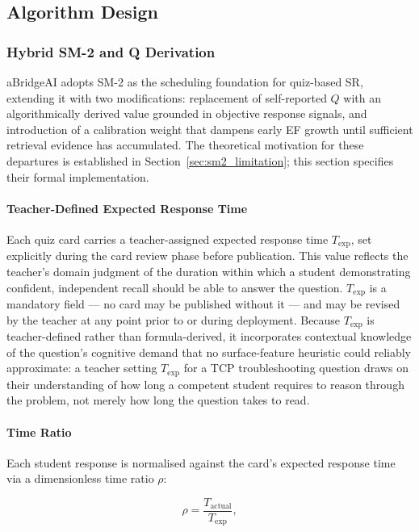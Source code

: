 \subsection{Algorithm Design}
\label{sec:system_sm2}
\subsubsection{Hybrid SM-2 and Q Derivation}
\label{sec:q_derivation}
aBridgeAI adopts SM-2 as the scheduling foundation for quiz-based SR, extending it with two modifications: replacement of self-reported $Q$ with an algorithmically derived value grounded in objective response signals, and introduction of a calibration weight that dampens early EF growth until sufficient retrieval evidence has accumulated. The theoretical motivation for these departures is established in Section~\ref{sec:sm2_limitation}; this section specifies their formal implementation.

\paragraph{Teacher-Defined Expected Response Time}
Each quiz card carries a teacher-assigned expected response time $T_{\text{exp}}$, set explicitly during the card review phase before publication. This value reflects the teacher's domain judgment of the duration within which a student demonstrating confident, independent recall should be able to answer the question. $T_{\text{exp}}$ is a mandatory field — no card may be published without it — and may be revised by the teacher at any point prior to or during deployment. Because $T_{\text{exp}}$ is teacher-defined rather than formula-derived, it incorporates contextual knowledge of the question's cognitive demand that no surface-feature heuristic could reliably approximate: a teacher setting $T_{\text{exp}}$ for a TCP troubleshooting question draws on their understanding of how long a competent student requires to reason through the problem, not merely how long the question takes to read.

\paragraph{Time Ratio}
Each student response is normalised against the card's expected response time via a dimensionless time ratio $\rho$:

\begin{equation}
    \rho = \frac{T_{\text{actual}}}{T_{\text{exp}}},
\end{equation}



